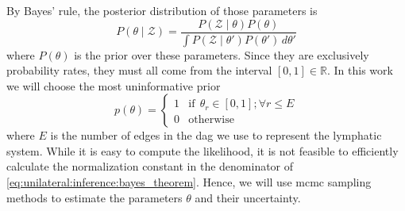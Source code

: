 \documentclass[\relativeRoot/main.tex]{subfiles}
\begin{document}
By Bayes' rule, the posterior distribution of those parameters is 
%
\begin{equation} \label{eq:unilateral:inference:bayes_theorem}
    P \left( \theta \mid \boldsymbol{\mathcal{Z}} \right) = \frac{P \left( \boldsymbol{\mathcal{Z}} \mid \theta \right) P\left( \theta \right)}{\int{P \left( \boldsymbol{\mathcal{Z}} \mid \theta' \right) P \left( \theta' \right) \,d\theta'}}
\end{equation}
%
where $P(\theta)$ is the prior over these parameters. Since they are exclusively probability rates, they must all come from the interval $[0,1] \in \mathbb{R}$. In this work we will choose the most uninformative prior
%
\begin{equation}
    p(\theta) = 
    \begin{cases}
        1 & \text{if} \ \ \theta_r \in \left[ 0,1 \right]; \forall r \leq E \\
        0 & \text{otherwise}
    \end{cases}
\end{equation}
%
where $E$ is the number of edges in the \gls{dag} we use to represent the lymphatic system. While it is easy to compute the likelihood, it is not feasible to efficiently calculate the normalization constant in the denominator of \cref{eq:unilateral:inference:bayes_theorem}. Hence, we will use \gls{mcmc} sampling methods to estimate the parameters $\theta$ and their uncertainty.
\end{document}

